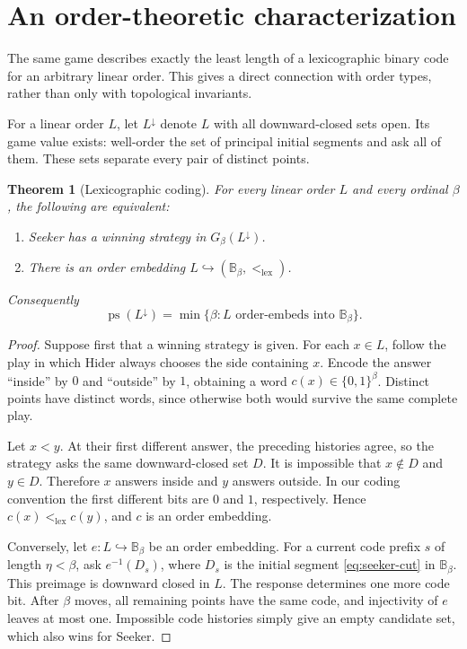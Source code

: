 \documentclass[11pt,a4paper]{article}
\newtheorem{theorem}{Theorem}[section]
\theoremstyle{definition}
\theoremstyle{remark}
\newcommand{\ps}{\operatorname{ps}}
\newcommand{\lex}{\mathrm{lex}}
\newcommand{\dd}{\downarrow}
\newcommand{\two}{\{0,1\}}
\newcommand{\B}{\mathbb B}
\begin{document}
\section{An order-theoretic characterization}

The same game describes exactly the least length of a lexicographic binary code
for an arbitrary linear order. This gives a direct connection with order types,
rather than only with topological invariants.

For a linear order $L$, let $L^\dd$ denote $L$ with all downward-closed sets open.
Its game value exists: well-order the set of principal initial segments and ask
all of them. These sets separate every pair of distinct points.

\begin{theorem}[Lexicographic coding]\label{thm:embedding}
For every linear order $L$ and every ordinal $\beta$, the following are
equivalent:
\begin{enumerate}[label=(\roman*)]
\item Seeker has a winning strategy in $G_\beta(L^\dd)$.
\item There is an order embedding $L\hookrightarrow(\B_\beta,<_{\lex})$.
\end{enumerate}
Consequently
\begin{equation}\label{eq:embedding-rank}
 \ps(L^\dd)=\min\{\beta:L\text{ order-embeds into }\B_\beta\}.
\end{equation}
\end{theorem}
\begin{proof}
Suppose first that a winning strategy is given. For each $x\in L$, follow the
play in which Hider always chooses the side containing $x$. Encode the answer
``inside'' by $0$ and ``outside'' by $1$, obtaining a word $c(x)\in\two^\beta$.
Distinct points have distinct words, since otherwise both would survive the
same complete play.

Let $x<y$. At their first different answer, the preceding histories agree, so
the strategy asks the same downward-closed set $D$. It is impossible that
$x\notin D$ and $y\in D$. Therefore $x$ answers inside and $y$ answers outside.
In our coding convention the first different bits are $0$ and $1$, respectively.
Hence $c(x)<_{\lex}c(y)$, and $c$ is an order embedding.

Conversely, let $e:L\hookrightarrow\B_\beta$ be an order embedding. For a
current code prefix $s$ of length $\eta<\beta$, ask $e^{-1}(D_s)$, where $D_s$
is the initial segment \eqref{eq:seeker-cut} in $\B_\beta$. This preimage is
downward closed in $L$. The response determines one more code bit. After
$\beta$ moves, all remaining points have the same code, and injectivity of $e$
leaves at most one. Impossible code histories simply give an empty candidate
set, which also wins for Seeker.
\end{proof}
\end{document}
